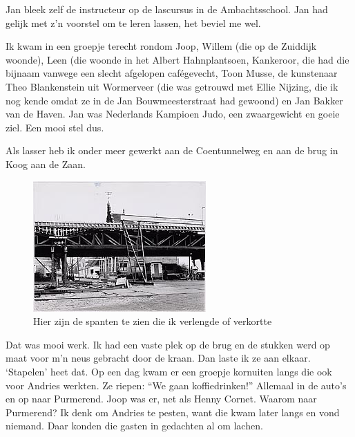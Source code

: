 \documentclass[10pt,twoside, openright]{memoir}
\begin{document}
Jan bleek zelf de instructeur op de lascursus in de Ambachtsschool. Jan had gelijk met z’n voorstel om te leren lassen, het beviel me wel.

Ik kwam in een groepje terecht rondom Joop, Willem (die op de Zuiddijk woonde), Leen (die woonde in het Albert Hahnplantsoen, Kankeroor, die had die bijnaam vanwege een slecht afgelopen cafégevecht, Toon Musse, de kunstenaar Theo Blankenstein uit Wormerveer (die was  getrouwd met Ellie Nijzing, die ik nog kende omdat ze in de Jan Bouwmeesterstraat had gewoond) en Jan Bakker van de Haven. Jan was Nederlands Kampioen Judo, een zwaargewicht en goeie ziel. Een mooi stel dus.

Als lasser heb ik onder meer gewerkt aan de Coentunnelweg en aan de brug in Koog aan de Zaan. 

\begin{figure}[t]
\includegraphics[width=\textwidth]{img/ch38/coentunnel3}
\caption*{\footnotesize Hier zijn de spanten te zien die ik verlengde of verkortte}
\end{figure}

Dat was mooi werk. Ik had een vaste plek op de brug en de stukken werd op maat voor m’n neus gebracht door de kraan. Dan laste ik ze aan elkaar. `Stapelen' heet dat. Op een dag kwam er een groepje kornuiten langs die ook voor Andries werkten. Ze riepen: ``We gaan koffiedrinken!'' Allemaal in de auto’s en op naar Purmerend. Joop was er, net als Henny Cornet. Waarom naar Purmerend? Ik denk om Andries te pesten, want die kwam later langs en vond niemand. Daar konden die gasten in gedachten al om lachen.
\end{document}
